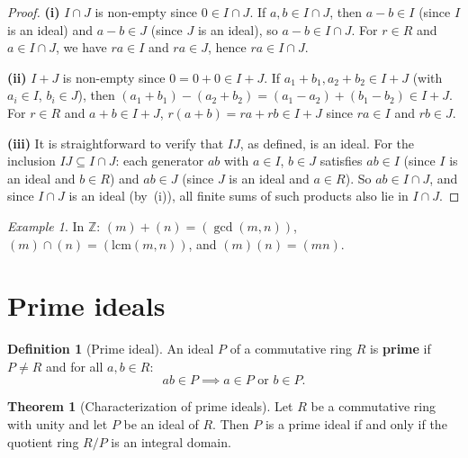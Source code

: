 \documentclass[12pt,a4paper,openany]{book}
\theoremstyle{definition}
\newtheorem{definition}{Definition}[chapter]
\newtheorem{theorem}{Theorem}[chapter]
\theoremstyle{remark}
\newtheorem{example}{Example}[chapter]
\renewcommand{\gcd}{\operatorname{gcd}}
\begin{document}
\begin{proof}
\textbf{(i)} $I\cap J$ is non-empty since $0\in I\cap J$. If $a,b\in I\cap J$, then $a-b\in I$ (since $I$ is an ideal) and $a-b\in J$ (since $J$ is an ideal), so $a-b\in I\cap J$. For $r\in R$ and $a\in I\cap J$, we have $ra\in I$ and $ra\in J$, hence $ra\in I\cap J$.

\textbf{(ii)} $I+J$ is non-empty since $0=0+0\in I+J$. If $a_1+b_1,a_2+b_2\in I+J$ (with $a_i\in I$, $b_i\in J$), then $(a_1+b_1)-(a_2+b_2)=(a_1-a_2)+(b_1-b_2)\in I+J$. For $r\in R$ and $a+b\in I+J$, $r(a+b)=ra+rb\in I+J$ since $ra\in I$ and $rb\in J$.

\textbf{(iii)} It is straightforward to verify that $IJ$, as defined, is an ideal. For the inclusion $IJ\subseteq I\cap J$: each generator $ab$ with $a\in I$, $b\in J$ satisfies $ab\in I$ (since $I$ is an ideal and $b\in R$) and $ab\in J$ (since $J$ is an ideal and $a\in R$). So $ab\in I\cap J$, and since $I\cap J$ is an ideal (by~(i)), all finite sums of such products also lie in $I\cap J$.
\end{proof}

\begin{example}\label{ex:ideal-operations-Z}
In $\mathbb{Z}$: $(m)+(n)=(\gcd(m,n))$, $(m)\cap(n)=(\mathrm{lcm}(m,n))$, and $(m)(n)=(mn)$.
\end{example}

\section{Prime ideals}\label{sec:prime-ideals}

\begin{definition}[Prime ideal]\label{def:prime-ideal}
An ideal $P$ of a commutative ring $R$ is \textbf{prime} if $P\neq R$ and for all $a,b\in R$:
\[
    ab\in P \implies a\in P \text{ or } b\in P.
\]
\end{definition}

\begin{theorem}[Characterization of prime ideals]\label{thm:prime-ideal-domain}
Let $R$ be a commutative ring with unity and let $P$ be an ideal of $R$. Then $P$ is a prime ideal if and only if the quotient ring $R/P$ is an integral domain.
\end{theorem}
\end{document}
